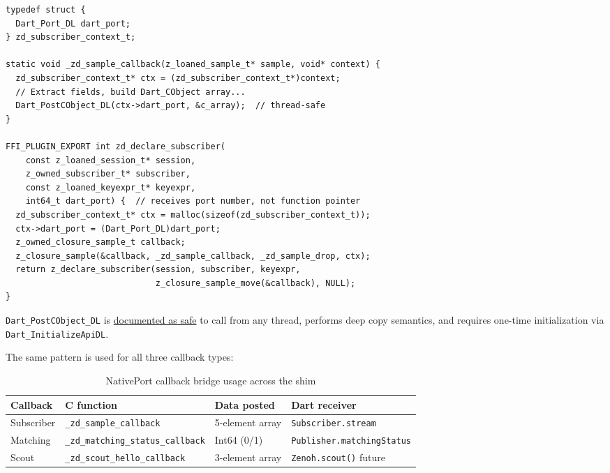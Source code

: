 \documentclass[11pt,a4paper]{article}
\newcommand{\code}[1]{\texttt{#1}}
\newcommand{\fn}[1]{\texttt{#1}}
\begin{document}
\begin{lstlisting}[style=cstyle,caption={NativePort callback bridge (C side)}]
typedef struct {
  Dart_Port_DL dart_port;
} zd_subscriber_context_t;

static void _zd_sample_callback(z_loaned_sample_t* sample, void* context) {
  zd_subscriber_context_t* ctx = (zd_subscriber_context_t*)context;
  // Extract fields, build Dart_CObject array...
  Dart_PostCObject_DL(ctx->dart_port, &c_array);  // thread-safe
}

FFI_PLUGIN_EXPORT int zd_declare_subscriber(
    const z_loaned_session_t* session,
    z_owned_subscriber_t* subscriber,
    const z_loaned_keyexpr_t* keyexpr,
    int64_t dart_port) {  // receives port number, not function pointer
  zd_subscriber_context_t* ctx = malloc(sizeof(zd_subscriber_context_t));
  ctx->dart_port = (Dart_Port_DL)dart_port;
  z_owned_closure_sample_t callback;
  z_closure_sample(&callback, _zd_sample_callback, _zd_sample_drop, ctx);
  return z_declare_subscriber(session, subscriber, keyexpr,
                              z_closure_sample_move(&callback), NULL);
}
\end{lstlisting}

\fn{Dart\_Post\-CObject\_DL} is
\href{https://api.dart.dev/stable/latest/dart-ffi/NativeApi/initializeApiDLData.html}{documented as safe}
to call from any thread, performs deep copy semantics, and requires
one-time initialization via \fn{Dart\_\allowbreak{}InitializeApiDL}.

The same pattern is used for all three callback types:

\begin{table}[ht]
\centering\footnotesize
\begin{tabularx}{\textwidth}{lLlL}
  \toprule
  \textbf{Callback} & \textbf{C function} & \textbf{Data posted} & \textbf{Dart receiver} \\
  \midrule
  Subscriber   & \fn{\_zd\_sample\_callback}           & 5-element array & \code{Subscriber.stream} \\
  Matching     & \fn{\_zd\_matching\_status\_callback}  & Int64 (0/1)  & \code{Publisher.matchingStatus} \\
  Scout        & \fn{\_zd\_scout\_hello\_callback}      & 3-element array & \code{Zenoh.scout()} future \\
  \bottomrule
\end{tabularx}
\caption{NativePort callback bridge usage across the shim}
\label{tab:callbacks}
\end{table}
\end{document}
